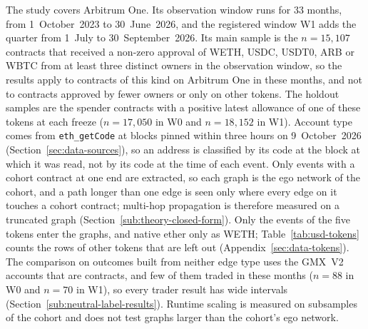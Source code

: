 
The study covers Arbitrum One. Its observation window runs for 33 months, from 1~October~2023 to 30~June~2026, and the registered window W1 adds the quarter from 1~July to 30~September~2026. Its main sample is the $n=15{,}107$ contracts that received a non-zero approval of WETH, USDC, USDT0, ARB or WBTC from at least three distinct owners in the observation window, so the results apply to contracts of this kind on Arbitrum One in these months, and not to contracts approved by fewer owners or only on other tokens. The holdout samples are the spender contracts with a positive latest allowance of one of these tokens at each freeze ($n=17{,}050$ in W0 and $n=18{,}152$ in W1). Account type comes from \texttt{eth\_getCode} at blocks pinned within three hours on 9~October~2026 (Section~\ref{sec:data-sources}), so an address is classified by its code at the block at which it was read, not by its code at the time of each event. Only events with a cohort contract at one end are extracted, so each graph is the ego network of the cohort, and a path longer than one edge is seen only where every edge on it touches a cohort contract; multi-hop propagation is therefore measured on a truncated graph (Section~\ref{sub:theory-closed-form}). Only the events of the five tokens enter the graphs, and native ether only as WETH; Table~\ref{tab:usd-tokens} counts the rows of other tokens that are left out (Appendix~\ref{sec:data-tokens}). The comparison on outcomes built from neither edge type uses the GMX~V2 accounts that are contracts, and few of them traded in these months ($n=88$ in W0 and $n=70$ in W1), so every trader result has wide intervals (Section~\ref{sub:neutral-label-results}). Runtime scaling is measured on subsamples of the cohort and does not test graphs larger than the cohort's ego network.

